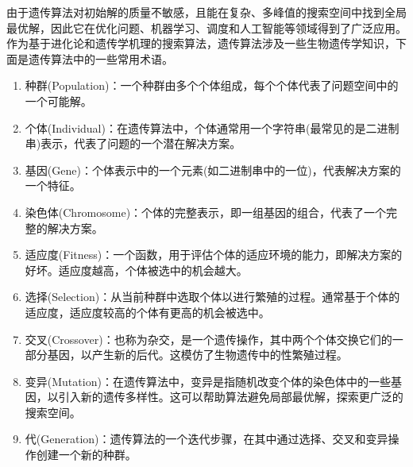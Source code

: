 由于遗传算法对初始解的质量不敏感，且能在复杂、多峰值的搜索空间中找到全局最优解，因此它在优化问题、机器学习、调度和人工智能等领域得到了广泛应用。
作为基于进化论和遗传学机理的搜索算法，遗传算法涉及一些生物遗传学知识，下面是遗传算法中的一些常用术语。
\begin{enumerate}[label=\arabic*)] 
  \item 种群(Population)：一个种群由多个个体组成，每个个体代表了问题空间中的一个可能解。

  \item 个体(Individual)：在遗传算法中，个体通常用一个字符串(最常见的是二进制串)表示，代表了问题的一个潜在解决方案。
  
  \item 基因(Gene)：个体表示中的一个元素(如二进制串中的一位)，代表解决方案的一个特征。
  
  \item 染色体(Chromosome)：个体的完整表示，即一组基因的组合，代表了一个完整的解决方案。
  
  \item 适应度(Fitness)：一个函数，用于评估个体的适应环境的能力，即解决方案的好坏。适应度越高，个体被选中的机会越大。
  
  \item 选择(Selection)：从当前种群中选取个体以进行繁殖的过程。通常基于个体的适应度，适应度较高的个体有更高的机会被选中。
  
  \item 交叉(Crossover)：也称为杂交，是一个遗传操作，其中两个个体交换它们的一部分基因，以产生新的后代。这模仿了生物遗传中的性繁殖过程。
  
  \item 变异(Mutation)：在遗传算法中，变异是指随机改变个体的染色体中的一些基因，以引入新的遗传多样性。这可以帮助算法避免局部最优解，探索更广泛的搜索空间。
  
  \item 代(Generation)：遗传算法的一个迭代步骤，在其中通过选择、交叉和变异操作创建一个新的种群。
  \end{enumerate}

